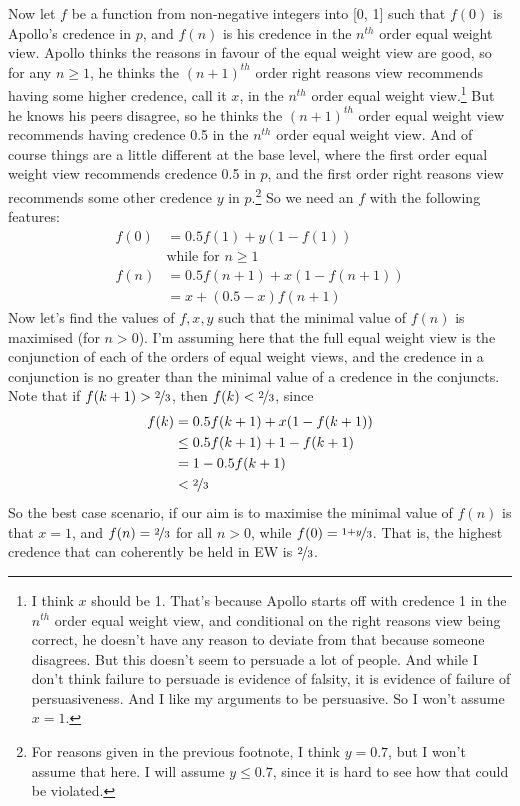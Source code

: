 Now let $f$ be a function from non-negative integers into [0, 1] such that $f(0)$ is Apollo's credence in $p$, and $f(n)$ is his credence in the $n^{th}$ order equal weight view. Apollo thinks the reasons in favour of the equal weight view are good, so for any $n \geq 1$, he thinks the $(n+1)^{th}$ order right reasons view recommends having some higher credence, call it $x$, in the $n^{th}$ order equal weight view.\footnote{I think $x$ should be 1. That's because Apollo starts off with credence 1 in the $n^{th}$ order equal weight view, and conditional on the right reasons view being correct, he doesn't have any reason to deviate from that because someone disagrees. But this doesn't seem to persuade a lot of people. And while I don't think failure to persuade is evidence of falsity, it is evidence of failure of persuasiveness. And I like my arguments to be persuasive. So I won't assume $x = 1$.}
 But he knows his peers disagree, so he thinks the $(n+1)^{th}$ order equal weight  view recommends having credence 0.5 in the $n^{th}$ order equal weight view. And of course things are a little different at the base level, where the first order equal weight view recommends credence 0.5 in $p$, and the first order right reasons view recommends some other credence $y$ in $p$.\footnote{For reasons given in the previous footnote, I think $y = 0.7$, but I won't assume that here. I will assume $y \leq 0.7$, since it is hard to see how that could be violated.} So we need an $f$ with the following features:
\begin{align}
f(0) &= 0.5f(1) + y(1-f(1)) \\
&\text{while for } n \geq 1\\
f(n) &= 0.5f(n+1) + x(1-f(n+1)) \\
&= x + (0.5-x)f(n+1)
\end{align}
\noindent Now let's find the values of $f, x, y$ such that the minimal value of $f(n)$ is maximised (for $n> 0$). I'm assuming here that the full equal weight view is the conjunction of each of the orders of equal weight views, and the credence in a conjunction is no greater than the minimal value of a credence in the conjuncts. Note that if $f(k+1) > \nicefrac{2}{3}$, then $f(k) < \nicefrac{2}{3}$, since 
\begin{align}
f(k) &= 0.5f(k+1) + x(1-f(k+1)) \\
&\leq 0.5f(k+1) + 1-f(k+1) \\
&= 1 - 0.5f(k+1) \\
&< \nicefrac{2}{3}
\end{align}
\noindent So the best case scenario, if our aim is to maximise the minimal value of $f(n)$ is that $x=1$, and $f(n) = \nicefrac{2}{3}$ for all $n>0$, while $f(0) = \nicefrac{1+y}{3}$. That is, the highest credence that can coherently be held in EW is $\nicefrac{2}{3}$.

